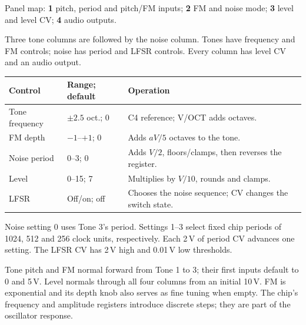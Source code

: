 Panel map: \textbf{1} pitch, period and pitch/FM inputs;
\textbf{2} FM and noise mode;
\textbf{3} level and level CV;
\textbf{4} audio outputs.

Three tone columns are followed by the noise column. Tones have frequency
and FM controls; noise has period and LFSR controls. Every column has level
CV and an audio output.

\begin{tabularx}{\textwidth}{@{}l l X@{}}
\toprule Control & Range; default & Operation \\\midrule
Tone frequency & $\pm2.5$ oct.; 0 & C4 reference; V/OCT adds octaves. \\
FM depth & $-1$--$+1$; 0 & Adds $aV/5$ octaves to the tone. \\
Noise period & 0--3; 0 & Adds $V/2$, floors/clamps, then reverses the register. \\
Level & 0--15; 7 & Multiplies by $V/10$, rounds and clamps. \\
LFSR & Off/on; off & Chooses the noise sequence; CV changes the switch state. \\
\bottomrule
\end{tabularx}

Noise setting 0 uses Tone 3's period. Settings 1--3 select fixed chip periods
of 1024, 512 and 256 clock units, respectively. Each 2\,V of period CV advances
one setting. The LFSR CV has 2\,V high and 0.01\,V low thresholds.

Tone pitch and FM normal forward from Tone 1 to 3; their first inputs default
to 0 and 5\,V. Level normals through all four columns from an initial 10\,V.
FM is exponential and its depth knob also serves as fine tuning when empty.
The chip's frequency and amplitude registers introduce discrete steps;
they are part of the oscillator response.
